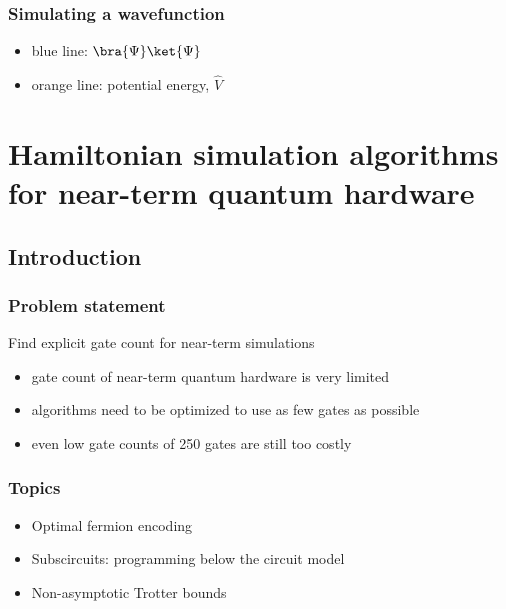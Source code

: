 \documentclass[10pt,a4paper]{beamer}
\begin{document}
\begin{frame}
  \frametitle{Simulating a wavefunction}
  \begin{itemize}
  	\item blue line:  $\bra{\Psi}\ket{\Psi}$ 
  	\item orange line: potential energy, $\hat{V}$
  \end{itemize}
\end{frame}




\section{Hamiltonian simulation algorithms for near-term quantum hardware}
\subsection{Introduction}
\begin{frame}
  \frametitle{Problem statement}
  \begin{Definition}
  Find explicit gate count for near-term simulations
  \end{Definition}
  \begin{itemize}
  	\item gate count of near-term quantum hardware is very limited
  	\item algorithms need to be optimized to use as few gates as possible
  	\item even low gate counts of 250 gates are still too costly
  \end{itemize}    
\end{frame}

\begin{frame}
\frametitle{Topics}
  \begin{itemize}
    \item Optimal fermion encoding 
  	\item Subscircuits: programming below the circuit model
  	\item Non-asymptotic Trotter bounds
  \end{itemize}    
\end{frame}
\end{document}
